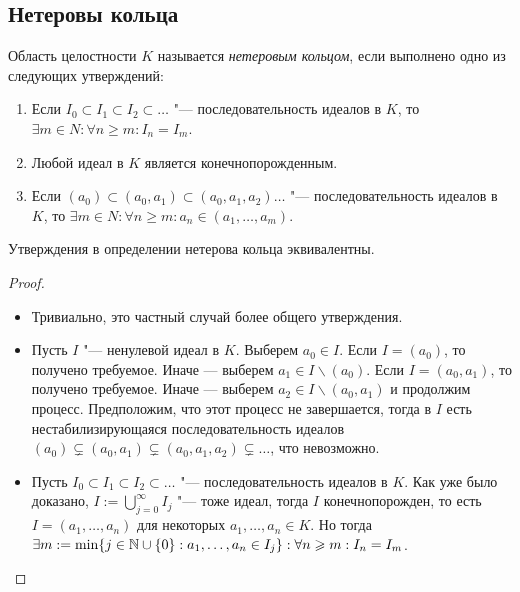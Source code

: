 \subsection{Нетеровы кольца}

\begin{definition}
	Область целостности $K$ называется \textit{нетеровым кольцом}, если выполнено одно из следующих утверждений:
	\begin{enumerate}
		\item Если $I_0 \subset I_1 \subset I_2 \subset \dots$ "--- последовательность идеалов в $K$, то $\exists m \in N: \forall n \ge m: I_n = I_m$.
		\item Любой идеал в $K$ является конечнопорожденным.
		\item Если $(a_0) \subset (a_0, a_1) \subset (a_0, a_1, a_2) \dots$ "--- последовательность идеалов в $K$, то $\exists m \in N: \forall n \ge m: a_n \in (a_1, \dotsc, a_m)$.
	\end{enumerate}
\end{definition}

\begin{proposition}
	Утверждения в определении нетерова кольца эквивалентны.
\end{proposition}

\begin{proof}~
	\begin{itemize}
		\item{}Тривиально, это частный случай более общего утверждения.
		\item{}Пусть $I$ "--- ненулевой идеал в $K$. Выберем $a_0 \in I$. Если $I = (a_0)$, то получено требуемое. Иначе --- выберем $a_1 \in I \backslash (a_0)$. Если $I = (a_0, a_1)$, то получено требуемое. Иначе --- выберем $a_2 \in I \backslash (a_0, a_1)$ и продолжим процесс. Предположим, что этот процесс не завершается, тогда в $I$ есть нестабилизирующаяся последовательность идеалов $(a_0) \subsetneq (a_0, a_1) \subsetneq (a_0, a_1, a_2) \subsetneq \dotsc$, что невозможно.
		\item{}Пусть $I_0 \subset I_1 \subset I_2 \subset \dots$ "--- последовательность идеалов в $K$. Как уже было доказано, $I := \bigcup_{j = 0}^\infty I_j$ "--- тоже идеал, тогда $I$ конечнопорожден, то есть $I = (a_1, \dotsc, a_n)$ для некоторых $a_1, \dotsc, a_n \in K$. Но тогда $\exists m := \min\{j \in \mathbb{N} \cup \{0\} : a_1, \dotsc, a_n \in I_j\}: \forall n \geqslant m: I_n = I_m$.\qedhere
	\end{itemize}
\end{proof}

